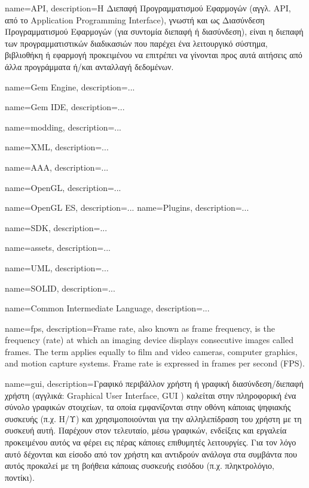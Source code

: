 {
	name=API,
	description={H Διεπαφή Προγραμματισμού Εφαρμογών (αγγλ. API, από το Application Programming Interface), γνωστή και ως Διασύνδεση Προγραμματισμού Εφαρμογών (για συντομία διεπαφή ή διασύνδεση), είναι η διεπαφή των προγραμματιστικών διαδικασιών που παρέχει ένα λειτουργικό σύστημα, βιβλιοθήκη ή εφαρμογή προκειμένου να επιτρέπει να γίνονται προς αυτά αιτήσεις από άλλα προγράμματα ή/και ανταλλαγή δεδομένων.}
}

{
	name=Gem Engine,
	description={...}
}

{
	name=Gem IDE,
	description={...}
}

{
	name=modding,
	description={...}
}

{
	name=XML,
	description={...}
}

{
	name=AAA,
	description={...}
}

{
	name=OpenGL,
	description={...}
}

{
	name=OpenGL ES,
	description={...}
}
{
	name=Plugins,
	description={...}
}

{
	name=SDK,
	description={...}
}

{
	name=assets,
	description={...}
}


{
	name=UML,
	description={...}
}

{
	name=SOLID,
	description={...}
}

{
	name=Common Intermediate Language,
	description={...}
}

{
	name={fps},
	description={Frame rate, also known as frame frequency, is the frequency (rate) at which an imaging device displays consecutive images called frames. The term applies equally to film and video cameras, computer graphics, and motion capture systems. Frame rate is expressed in frames per second (FPS).}
}

{
	name={gui},
	description={Γραφικό περιβάλλον χρήστη ή γραφική διασύνδεση/διεπαφή χρήστη (αγγλικά: Graphical User Interface, GUI ) καλείται στην πληροφορική ένα σύνολο γραφικών στοιχείων, τα οποία εμφανίζονται στην οθόνη κάποιας ψηφιακής συσκευής (π.χ. Η/Υ) και χρησιμοποιούνται για την αλληλεπίδραση του χρήστη με τη συσκευή αυτή. Παρέχουν στον τελευταίο, μέσω γραφικών, ενδείξεις και εργαλεία προκειμένου αυτός να φέρει εις πέρας κάποιες επιθυμητές λειτουργίες. Για τον λόγο αυτό δέχονται και είσοδο από τον χρήστη και αντιδρούν ανάλογα στα συμβάντα που αυτός προκαλεί με τη βοήθεια κάποιας συσκευής εισόδου (π.χ. πληκτρολόγιο, ποντίκι).}		
}

